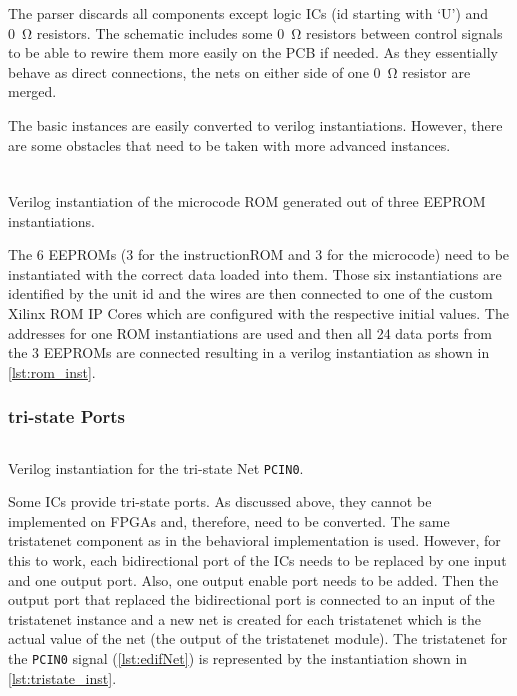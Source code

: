 The parser discards all components except logic \glspl{IC} (id starting with `U') and \qty{0}{\ohm} resistors.
The schematic includes some \qty{0}{\ohm} resistors between control signals to be able to rewire them more easily on the \gls{PCB} if needed.
As they essentially behave as direct connections, the nets on either side of one \qty{0}{\ohm} resistor are merged.

The basic instances are easily converted to verilog instantiations.
However, there are some obstacles that need to be taken with more advanced instances.
\subsubsection{}
\begin{listing}[t]
  \inputminted[linenos,
    breaklines,
    firstline=1364,
    lastline=1368,
    frame=leftline,
    xleftmargin=20pt,
  ]{Verilog}{src/generated.v}
  \caption{Verilog instantiation of the microcode ROM generated out of three \gls{EEPROM} instantiations.}
  \label{lst:rom_inst}
\end{listing}
The 6 \glspl{EEPROM} (3 for the instructionROM and 3 for the microcode) need to be instantiated with the correct data loaded into them.
Those six instantiations are identified by the unit id and the wires are then connected to one of the custom Xilinx ROM IP Cores which are configured with the respective initial values.
The addresses for one ROM instantiations are used and then all 24 data ports from the 3 \glspl{EEPROM} are connected resulting in a verilog instantiation as shown in \cref{lst:rom_inst}.
\subsubsection{tri-state Ports}
\begin{listing}[t]
  \inputminted[linenos,
    breaklines,
    firstline=1794,
    lastline=1801,
    frame=leftline,
    xleftmargin=20pt,
  ]{Verilog}{src/generated.v}
\caption{Verilog instantiation for the tri-state Net \texttt{PCIN0}.}
  \label{lst:tristate_inst}
\end{listing}
Some \glspl{IC} provide tri-state ports.
As discussed above, they cannot be implemented on \glspl{FPGA} and, therefore, need to be converted.
The same tristatenet component as in the behavioral implementation is used.
However, for this to work, each bidirectional port of the \glspl{IC} needs to be replaced by one input and one output port.
Also, one output enable port needs to be added.
Then the output port that replaced the bidirectional port is connected to an input of the tristatenet instance and a new net is created for each tristatenet which is the actual value of the net (the output of the tristatenet module).
The tristatenet for the \texttt{PCIN0} signal (\cref{lst:edifNet}) is represented by the instantiation shown in \cref{lst:tristate_inst}.

